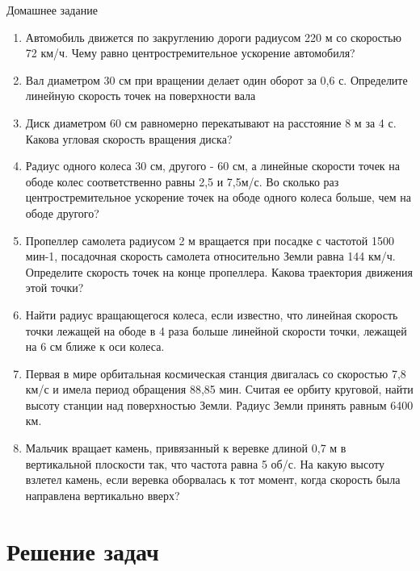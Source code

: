 \documentclass[a5paper, 10pt]{diss_4}
\renewcommand{\'}{\,'}
\begin{document}
\begin{center}
   Домашнее задание
\end{center}
\begin{enumerate}
\item Автомобиль движется по закруглению дороги радиусом 220 м со скоростью 72 км/ч. Чему равно центростремительное ускорение автомобиля?
\item Вал диаметром 30 см при вращении делает один оборот за 0,6 с. Определите линейную скорость точек на поверхности вала
\item Диск диаметром 60 см равномерно перекатывают на расстояние 8 м за 4 с. Какова угловая скорость вращения диска?
\item Радиус одного колеса 30 см, другого - 60 см, а линейные скорости точек на ободе колес соответственно равны 2,5 и 7,5м/с. Во сколько раз центростремительное ускорение точек на ободе одного колеса больше, чем на ободе другого?
\item Пропеллер самолета радиусом 2 м вращается при посадке с частотой 1500 мин-1, посадочная скорость самолета относительно Земли равна 144 км/ч. Определите скорость точек на конце пропеллера. Какова траектория движения этой точки?
\item Найти радиус вращающегося колеса, если известно, что линейная скорость точки лежащей на ободе в 4 раза больше линейной скорости точки, лежащей на 6 см ближе к оси колеса.
\item Первая в мире орбитальная космическая станция двигалась со скоростью 7,8 км/с и имела период обращения 88,85 мин. Считая ее орбиту круговой, найти высоту станции над поверхностью Земли. Радиус Земли принять равным 6400 км.
\item Мальчик вращает камень, привязанный к веревке длиной 0,7 м в вертикальной плоскости так, что частота равна 5 об/с. На какую высоту взлетел камень, если веревка оборвалась к тот момент, когда скорость была направлена вертикально вверх?
\end{enumerate}

\section{Решение задач}
\end{document}
